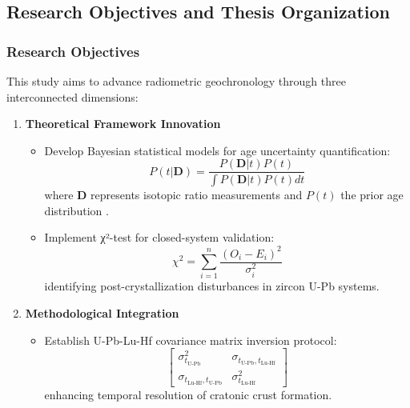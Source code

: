 \documentclass{article}
\begin{document}
\subsection{Research Objectives and Thesis Organization}
\label{subsec:objectives}

\subsubsection*{Research Objectives}
This study aims to advance radiometric geochronology through three interconnected dimensions:

\begin{enumerate}
    \item \textbf{Theoretical Framework Innovation}
    \begin{itemize}
        \item Develop Bayesian statistical models for age uncertainty quantification:
        \begin{equation}
            P(t|\mathbf{D}) = \frac{P(\mathbf{D}|t)P(t)}{\int P(\mathbf{D}|t)P(t)dt}
            \label{eq:bayesian}
        \end{equation}
        where $\mathbf{D}$ represents isotopic ratio measurements and $P(t)$ the prior age distribution \cite{Ludwig2003}.
        
        \item Implement χ²-test for closed-system validation:
        \begin{equation}
            \chi^2 = \sum_{i=1}^n \frac{(O_i - E_i)^2}{\sigma_i^2}
            \label{eq:chi2}
        \end{equation}
        identifying post-crystallization disturbances in zircon U-Pb systems.
    \end{itemize}

    \item \textbf{Methodological Integration}
    \begin{itemize}
        \item Establish U-Pb-Lu-Hf covariance matrix inversion protocol:
        \begin{equation}
            \begin{bmatrix}
            \sigma_{t_{\text{U-Pb}}}^2 & \sigma_{t_{\text{U-Pb}}, t_{\text{Lu-Hf}}} \\
            \sigma_{t_{\text{Lu-Hf}}, t_{\text{U-Pb}}} & \sigma_{t_{\text{Lu-Hf}}}^2
            \end{bmatrix}
            \label{eq:covariance}
        \end{equation}
        enhancing temporal resolution of cratonic crust formation.
    \end{itemize}


\end{enumerate}
\end{document}
